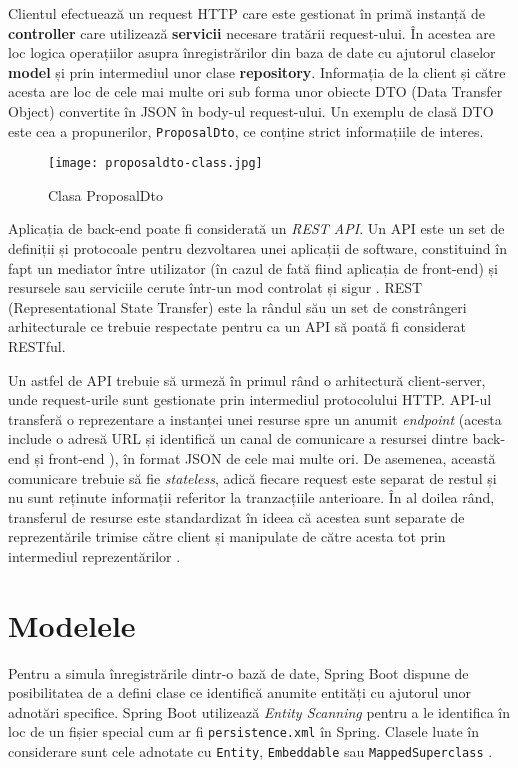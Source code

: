 Clientul efectuează un request HTTP care este gestionat în primă instanță de \textbf{controller} care utilizează \textbf{servicii} necesare tratării request-ului. În acestea are loc logica operațiilor asupra înregistrărilor din baza de date cu ajutorul claselor \textbf{model} și prin intermediul unor clase \textbf{repository}. Informația de la client și către acesta are loc de cele mai multe ori sub forma unor obiecte DTO (Data Transfer Object) convertite în JSON în body-ul request-ului. Un exemplu de clasă DTO este cea a propunerilor, \texttt{ProposalDto}, ce conține strict informațiile de interes.

\begin{figure}[H]
	\centering
	\texttt{[image: proposaldto-class.jpg]}
	\caption{Clasa ProposalDto}
\end{figure}

Aplicația de back-end poate fi considerată un \textit{REST API}. Un API este un set de definiții și protocoale pentru dezvoltarea unei aplicații de software, constituind în fapt un mediator între utilizator (în cazul de fată fiind aplicația de front-end) și resursele sau serviciile cerute într-un mod controlat și sigur \cite{rest-api}. REST (Representational State Transfer) este la rândul său un set de constrângeri arhitecturale ce trebuie respectate pentru ca un API să poată fi considerat RESTful.

Un astfel de API trebuie să urmeză în primul rând o arhitectură client-server, unde request-urile sunt gestionate prin intermediul protocolului HTTP. API-ul transferă o reprezentare a instanței unei resurse spre un anumit \textit{endpoint} (acesta include o adresă URL și identifică un canal de comunicare a resursei dintre back-end și front-end \cite{api-endpoint}), în format JSON de cele mai multe ori. De asemenea, această comunicare trebuie să fie \textit{stateless}, adică fiecare request este separat de restul și nu sunt reținute informații referitor la tranzacțiile anterioare. În al doilea rând, transferul de resurse este standardizat în ideea că acestea sunt separate de reprezentările trimise către client și manipulate de către acesta tot prin intermediul reprezentărilor \cite{rest-api}.

\section{Modelele}

Pentru a simula înregistrările dintr-o bază de date, Spring Boot dispune de posibilitatea de a defini clase ce identifică anumite entități cu ajutorul unor adnotări specifice. Spring Boot utilizează \textit{Entity Scanning} pentru a le identifica în loc de un fișier special cum ar fi \texttt{persistence.xml} în Spring. Clasele luate în considerare sunt cele adnotate cu \texttt{Entity}, \texttt{Embeddable} sau \texttt{MappedSuperclass} \cite{spring-boot-docs}.

